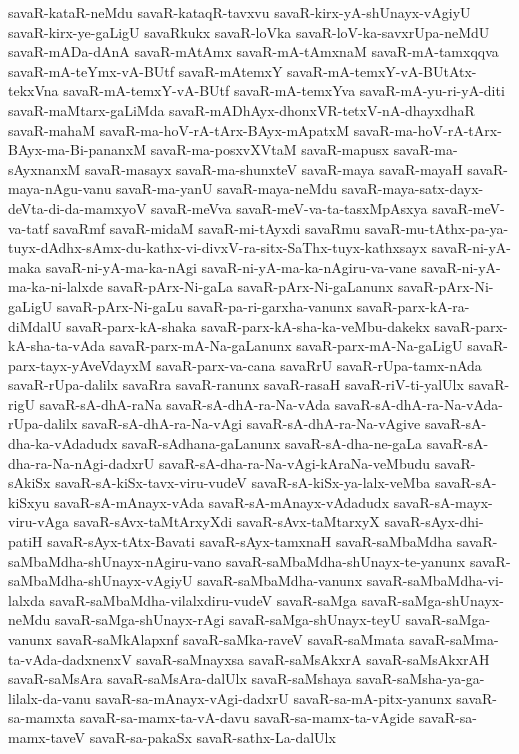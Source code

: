 {savaR-kataR-neMdu
savaR-kataqR-tavxvu
savaR-kirx-yA-shUnayx-vAgiyU
savaR-kirx-ye-gaLigU
savaRkukx
savaR-loVka
savaR-loV-ka-savxrUpa-neMdU
savaR-mADa-dAnA
savaR-mAtAmx
savaR-mA-tAmxnaM
savaR-mA-tamxqqva
savaR-mA-teYmx-vA-BUtf
savaR-mAtemxY
savaR-mA-temxY-vA-BUtAtx-tekxVna
savaR-mA-temxY-vA-BUtf
savaR-mA-temxYva
savaR-mA-yu-ri-yA-diti
savaR-maMtarx-gaLiMda
savaR-mADhAyx-dhonxVR-tetxV-nA-dhayxdhaR
savaR-mahaM
savaR-ma-hoV-rA-tArx-BAyx-mApatxM
savaR-ma-hoV-rA-tArx-BAyx-ma-Bi-pananxM
savaR-ma-posxvXVtaM
savaR-mapusx
savaR-ma-sAyxnanxM
savaR-masayx
savaR-ma-shunxteV
savaR-maya
savaR-mayaH
savaR-maya-nAgu-vanu
savaR-ma-yanU
savaR-maya-neMdu
savaR-maya-satx-dayx-deVta-di-da-mamxyoV
savaR-meVva
savaR-meV-va-ta-tasxMpAsxya
savaR-meV-va-tatf
savaRmf
savaR-midaM
savaR-mi-tAyxdi
savaRmu
savaR-mu-tAthx-pa-ya-tuyx-dAdhx-sAmx-du-kathx-vi-divxV-ra-sitx-SaThx-tuyx-kathxsayx
savaR-ni-yA-maka
savaR-ni-yA-ma-ka-nAgi
savaR-ni-yA-ma-ka-nAgiru-va-vane
savaR-ni-yA-ma-ka-ni-lalxde
savaR-pArx-Ni-gaLa
savaR-pArx-Ni-gaLanunx
savaR-pArx-Ni-gaLigU
savaR-pArx-Ni-gaLu
savaR-pa-ri-garxha-vanunx
savaR-parx-kA-ra-diMdalU
savaR-parx-kA-shaka
savaR-parx-kA-sha-ka-veMbu-dakekx
savaR-parx-kA-sha-ta-vAda
savaR-parx-mA-Na-gaLanunx
savaR-parx-mA-Na-gaLigU
savaR-parx-tayx-yAveVdayxM
savaR-parx-va-cana
savaRrU
savaR-rUpa-tamx-nAda
savaR-rUpa-dalilx
savaRra
savaR-ranunx
savaR-rasaH
savaR-riV-ti-yalUlx
savaR-rigU
savaR-sA-dhA-raNa
savaR-sA-dhA-ra-Na-vAda
savaR-sA-dhA-ra-Na-vAda-rUpa-dalilx
savaR-sA-dhA-ra-Na-vAgi
savaR-sA-dhA-ra-Na-vAgive
savaR-sA-dha-ka-vAdadudx
savaR-sAdhana-gaLanunx
savaR-sA-dha-ne-gaLa
savaR-sA-dha-ra-Na-nAgi-dadxrU
savaR-sA-dha-ra-Na-vAgi-kAraNa-veMbudu
savaR-sAkiSx
savaR-sA-kiSx-tavx-viru-vudeV
savaR-sA-kiSx-ya-lalx-veMba
savaR-sA-kiSxyu
savaR-sA-mAnayx-vAda
savaR-sA-mAnayx-vAdadudx
savaR-sA-mayx-viru-vAga
savaR-sAvx-taMtArxyXdi
savaR-sAvx-taMtarxyX
savaR-sAyx-dhi-patiH
savaR-sAyx-tAtx-Bavati
savaR-sAyx-tamxnaH
savaR-saMbaMdha
savaR-saMbaMdha-shUnayx-nAgiru-vano
savaR-saMbaMdha-shUnayx-te-yanunx
savaR-saMbaMdha-shUnayx-vAgiyU
savaR-saMbaMdha-vanunx
savaR-saMbaMdha-vi-lalxda
savaR-saMbaMdha-vilalxdiru-vudeV
savaR-saMga
savaR-saMga-shUnayx-neMdu
savaR-saMga-shUnayx-rAgi
savaR-saMga-shUnayx-teyU
savaR-saMga-vanunx
savaR-saMkAlapxnf
savaR-saMka-raveV
savaR-saMmata
savaR-saMma-ta-vAda-dadxnenxV
savaR-saMnayxsa
savaR-saMsAkxrA
savaR-saMsAkxrAH
savaR-saMsAra
savaR-saMsAra-dalUlx
savaR-saMshaya
savaR-saMsha-ya-ga-lilalx-da-vanu
savaR-sa-mAnayx-vAgi-dadxrU
savaR-sa-mA-pitx-yanunx
savaR-sa-mamxta
savaR-sa-mamx-ta-vA-davu
savaR-sa-mamx-ta-vAgide
savaR-sa-mamx-taveV
savaR-sa-pakaSx
savaR-sathx-La-dalUlx
}
